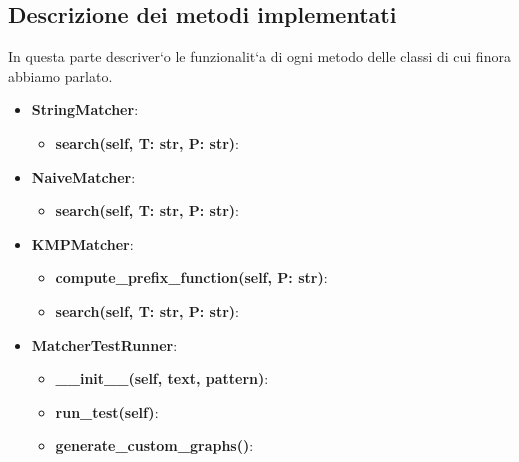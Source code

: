 \documentclass{article}
\begin{document}
\subsection{Descrizione dei metodi implementati}
In questa parte descriver`o le funzionalit`a di ogni metodo delle classi di cui finora abbiamo parlato.
\begin{itemize}
    \item \textbf{StringMatcher}:
    \begin{itemize}
        \item \textbf{search(self, T: str, P: str)}:
    \end{itemize}
    \item \textbf{NaiveMatcher}:
    \begin{itemize}
        \item \textbf{search(self, T: str, P: str)}:
    \end{itemize}
    \item \textbf{KMPMatcher}:
    \begin{itemize}
        \item \textbf{compute\_prefix\_function(self, P: str)}:
        \item \textbf{search(self, T: str, P: str)}:
    \end{itemize}
    \item \textbf{MatcherTestRunner}:
    \begin{itemize}
        \item \textbf{\_\_init\_\_(self, text, pattern)}:
        \item \textbf{run\_test(self)}:
        \item \textbf{generate\_custom\_graphs()}:
    \end{itemize}
\end{itemize}
\end{document}
